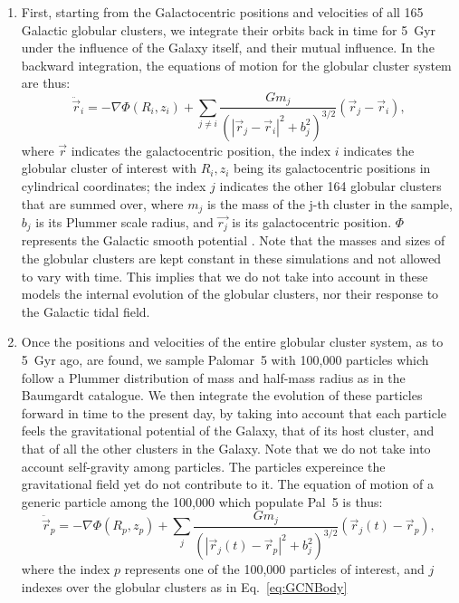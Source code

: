 \documentclass[draft]{aa}
\begin{document}
    \begin{enumerate}
      \item First, starting from the Galactocentric positions and velocities of all 165 Galactic globular clusters, we integrate their orbits back in time for 5~Gyr under the influence of the Galaxy itself, and their mutual influence. In the backward integration, the equations of motion for the globular cluster system are thus: 
      \begin{equation}
        \ddot{\vec{r}}_i = -\nabla \Phi(R_i,z_i) + \left.\sum_{j\neq i} \frac{Gm_j}{\left(|\vec{r}_j - \vec{r}_i|^2 + b_j^2\right)^{3/2}}\right. \left(\vec{r}_j - \vec{r}_i\right),
      \end{equation}\label{eq:GCNBody} where $\vec{r}$ indicates the galactocentric position, the index $i$ indicates the globular cluster of interest with $R_i,z_i$ being its galactocentric positions in cylindrical coordinates; the index $j$ indicates the other 164 globular clusters that are summed over, where $m_j$ is the mass of the j-th cluster in the sample, $b_j$ is its Plummer scale radius, and $\vec{r_j}$ is its galactocentric position. $\Phi$ represents the Galactic smooth potential \citep[][Model~II, in the present case]{2017A&A...598A..66P}. Note that the masses and sizes of the globular clusters are kept constant in these simulations and not allowed to vary with time. This implies that  we do not take into account in these models the internal evolution of the globular clusters, nor their response to the Galactic tidal field.
    
      \item Once the positions and velocities of the entire globular cluster system, as to 5~Gyr ago, are found, we sample Palomar~5 with  100,000 particles which follow a Plummer distribution of mass and half-mass radius as in the Baumgardt catalogue.  We then integrate the evolution of these particles forward in time to the present day, by taking into account that each particle feels the gravitational potential of the Galaxy, that of its host cluster, and that of all the other clusters in the Galaxy. Note that we do not take into account self-gravity among particles. The particles expereince the gravitational field yet do not contribute to it. The equation of motion of a generic particle among the 100,000 which populate Pal~5 is thus: 
    \begin{equation}
      \ddot{\vec{r}}_p = -\nabla \Phi(R_p,z_p) + \left.\sum_{j} \frac{Gm_j}{\left(|\vec{r}_j(t) - \vec{r}_p|^2 + b_j^2\right)^{3/2}}\right. \left(\vec{r}_j(t)- \vec{r}_p\right),
      \end{equation} \label{eq:equation_of_motion_particle} where the index $p$ represents one of the 100,000 particles of interest, and $j$ indexes over the globular clusters as in Eq.~\ref{eq:GCNBody}

    \end{enumerate}
\end{document}
